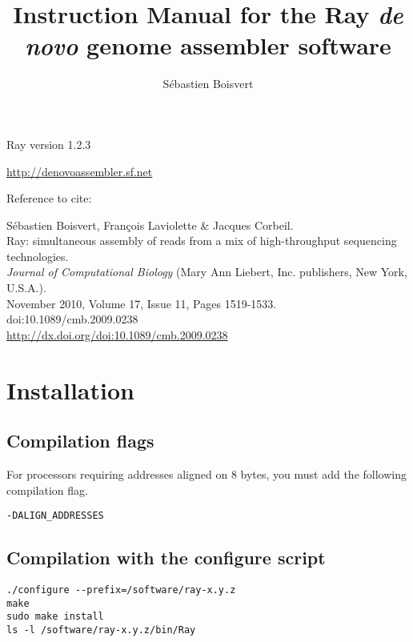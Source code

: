 \documentclass{article}
\begin{document}
\author{Sébastien Boisvert}
\title{Instruction Manual for the Ray \emph{de novo} genome assembler software}
\maketitle


Ray version 1.2.3

\vspace{2cm}

\href{http://denovoassembler.sf.net}{http://denovoassembler.sf.net}

\vspace{2cm}

Reference to cite: 
\vspace{2cm}

\noindent
Sébastien Boisvert, François Laviolette \& Jacques Corbeil.\\
Ray: simultaneous assembly of reads from a mix of high-throughput sequencing technologies.\\
\emph{Journal of Computational Biology} (Mary Ann Liebert, Inc. publishers, New York, U.S.A.).\\
November 2010, Volume 17, Issue 11, Pages 1519-1533.\\
doi:10.1089/cmb.2009.0238\\
\href{http://dx.doi.org/doi:10.1089/cmb.2009.0238}{http://dx.doi.org/doi:10.1089/cmb.2009.0238}

\newpage
\tableofcontents
\newpage

\section{Installation}

\subsection{Compilation flags}

For processors requiring addresses aligned on 8 bytes, you must add the following compilation flag.

\begin{verbatim}
-DALIGN_ADDRESSES
\end{verbatim}

\subsection{Compilation with the configure script}

\begin{verbatim}
./configure --prefix=/software/ray-x.y.z
make
sudo make install
ls -l /software/ray-x.y.z/bin/Ray
\end{verbatim}
\end{document}
